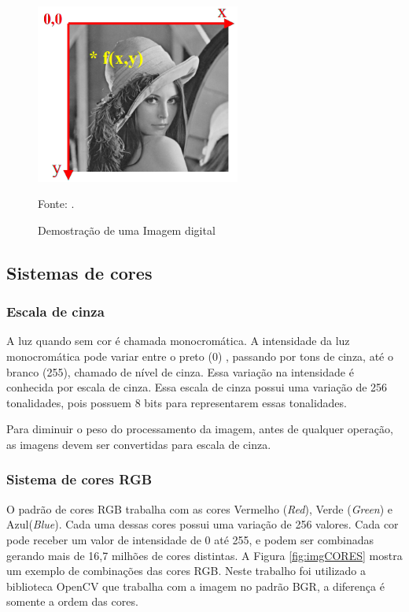 \begin{figure}[H]
 \centering
 \includegraphics[width=0.60\textwidth]{./fig/fundamentacao/lenna}
 \caption{Demostração de uma Imagem digital}
  Fonte: \cite{imagemDigital2019}.
 \label{fig:imgDigital}
\end{figure}


\subsection{Sistemas de cores}
\label{sub:siscores}

\subsubsection{Escala de cinza}
\label{subsub:siscores-cinza}

A luz quando sem cor é chamada monocromática. A intensidade da luz monocromática pode variar entre o preto (0) , passando por tons de cinza, até o branco (255), chamado de nível de cinza. Essa variação na intensidade é conhecida por escala de cinza. 
Essa escala de cinza possui uma variação de 256 tonalidades, pois possuem 8 bits para representarem essas tonalidades. 

Para diminuir o peso do processamento da imagem, antes de qualquer operação, as imagens devem ser convertidas para escala de cinza.\cite{digitalImgProcess2010}


\subsubsection{Sistema de cores RGB}
\label{subsub:siscores-RGB}

O padrão de cores RGB trabalha com as cores   Vermelho (\textit{Red}), Verde (\textit{Green}) e  Azul(\textit{Blue}). Cada uma dessas cores possui uma variação de 256 valores.  Cada cor pode receber um valor de intensidade de 0 até 255, e podem ser combinadas gerando mais de 16,7 milhões de cores distintas.  A Figura  \ref{fig:imgCORES} mostra um exemplo de combinações das cores RGB.  Neste trabalho foi utilizado a biblioteca OpenCV que trabalha com a imagem no padrão BGR, a diferença é somente a ordem das cores.

